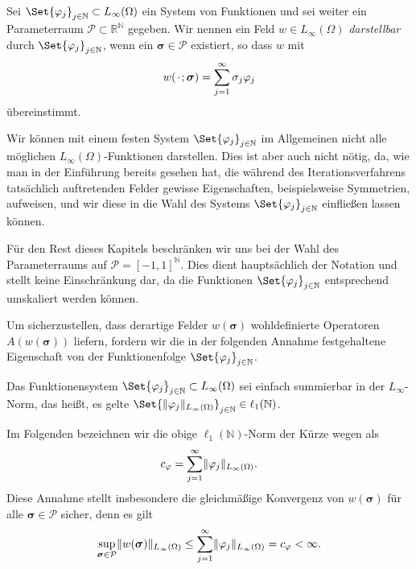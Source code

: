 \documentclass[../main.tex]{subfiles}
\begin{document}
\begin{Definition}
\label{definition:feld_entwickelbar}
    Sei $\Set{\varphi_{j}}_{j \in \mathbb{N}} \subset L_{\infty}(\Omega)$ ein System von Funktionen und sei weiter ein Parameterraum $\mathcal P \subset \mathbb{R}^{\mathbb{N}}$ gegeben.
    Wir nennen ein Feld $w \in L_{\infty}(\Omega)$ \emph{darstellbar} durch $\Set{\varphi_{j}}_{j \in \mathbb{N}}$, wenn ein $\bm{\sigma} \in \mathcal P$ existiert, so dass $w$ mit
    \begin{equation}
        w({\mkern2mu\cdot\mkern2mu}; \bm\sigma) = \sum_{j = 1}^{\infty} \sigma_{j} \varphi_{j}
    \end{equation}
    übereinstimmt.
\end{Definition}

Wir können mit einem festen System $\Set{\varphi_{j}}_{j \in \mathbb{N}}$ im Allgemeinen nicht alle möglichen $L_{\infty}(\Omega)$-Funktionen darstellen.
Dies ist aber auch nicht nötig, da, wie man in der Einführung bereits gesehen hat, die während des Iterationsverfahrens tatsächlich auftretenden Felder gewisse Eigenschaften, beispielsweise Symmetrien, aufweisen, und wir diese in die Wahl des Systems $\Set{\varphi_{j}}_{j \in \mathbb{N}}$ einfließen lassen können.

\begin{Bemerkung}
    Für den Rest dieses Kapitels beschränken wir uns bei der Wahl des Parameterraums auf $\mathcal P = [-1, 1]^{\mathbb{N}}$.
    Dies dient hauptsächlich der Notation und stellt keine Einschränkung dar, da die Funktionen $\Set{ \varphi_{j} }_{j \in \mathbb{N}}$ entsprechend umskaliert werden können.
\end{Bemerkung}

Um sicherzustellen, dass derartige Felder $w(\bm\sigma)$ wohldefinierte Operatoren $A(w(\bm\sigma))$ liefern, fordern wir die in der folgenden Annahme festgehaltene Eigenschaft von der Funktionenfolge $\Set{\varphi_{j}}_{j \in \mathbb{N}}$.

\begin{Annahme}
\label{annahme:system_l1_summierbar}
    Das Funktionensystem $\Set{ \varphi_{j} }_{j \in \mathbb{N}} \subset L_{\infty}(\Omega)$ sei einfach summierbar in der $L_{\infty}$-Norm, das heißt, es gelte $\Set{ \norm{\varphi_{j}}_{L_{\infty}(\Omega) } }_{j \in \mathbb{N}} \in \ell_{1}(\mathbb{N})$.
\end{Annahme}

Im Folgenden bezeichnen wir die obige $\ell_{1}(\mathbb{N})$-Norm der Kürze wegen als
\begin{equation}
\label{eq:system_l1_norm}
    c_{\varphi} = \sum_{j = 1}^{\infty} \lVert\varphi_{j}\rVert_{L_{\infty}(\Omega)}.
\end{equation}
Diese Annahme stellt insbesondere die gleichmäßige Konvergenz von $w(\bm\sigma)$ für alle $\bm\sigma \in \mathcal P$ sicher, denn es gilt
\begin{equation}
\label{eq:rz_feld_norm_schranke}
    \sup_{\bm\sigma \in \mathcal P} \lVert w(\bm\sigma)\rVert_{L_{\infty}(\Omega)} \leq \sum_{j = 1}^{\infty} \lVert\varphi_{j}\rVert_{L_{\infty}(\Omega)} = c_{\varphi} < \infty.
\end{equation}
\end{document}
